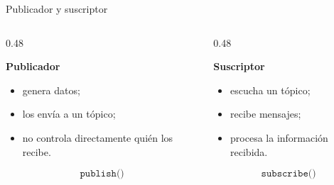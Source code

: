 \documentclass[aspectratio=169]{beamer}
\begin{document}
\begin{frame}{Publicador y suscriptor}

    \begin{columns}[T]

        \begin{column}{0.48\textwidth}

            \textbf{Publicador}

            \begin{itemize}
                \item genera datos;
                \item los envía a un tópico;
                \item no controla directamente quién los recibe.
            \end{itemize}

            \[
            \texttt{publish()}
            \]

        \end{column}

        \begin{column}{0.48\textwidth}

            \textbf{Suscriptor}

            \begin{itemize}
                \item escucha un tópico;
                \item recibe mensajes;
                \item procesa la información recibida.
            \end{itemize}

            \[
            \texttt{subscribe()}
            \]

        \end{column}

    \end{columns}

    \vspace{0.3cm}


\end{frame}
\end{document}
